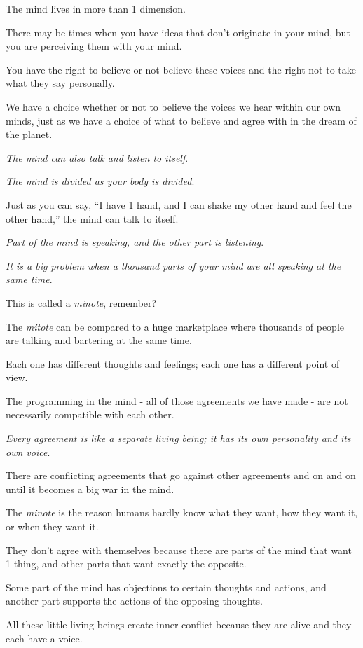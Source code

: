 \documentclass{article}
\numberwithin{equation}{section}
\begin{document}
The mind lives in more than 1 dimension.

There may be times when you have ideas that don't originate in your mind, but you are perceiving them with your mind.

You have the right to believe or not believe these voices and the right not to take what they say personally.

We have a choice whether or not to believe the voices we hear within our own minds, just as we have a choice of what to believe and agree with in the dream of the planet.

%
\textit{The mind can also talk and listen to itself}.

\textit{The mind is divided as your body is divided}.

Just as you can say, ``I have 1 hand, and I can shake my other hand and feel the other hand,'' the mind can talk to itself.

\textit{Part of the mind is speaking, and the other part is listening}.

\textit{It is a big problem when a thousand parts of your mind are all speaking at the same time}.

This is called a \textit{minote}, remember?

%
The \textit{mitote} can be compared to a huge marketplace where thousands of people are talking and bartering at the same time.

Each one has different thoughts and feelings; each one has a different point of view.

The programming in the mind - all of those agreements we have made - are not necessarily compatible with each other.

\textit{Every agreement is like a separate living being; it has its own personality and its own voice}.

There are conflicting agreements that go against other agreements and on and on until it becomes a big war in the mind.

The \textit{minote} is the reason humans hardly know what they want, how they want it, or when they want it.

They don't agree with themselves because there are parts of the mind that want 1 thing, and other parts that want exactly the opposite.

%
Some part of the mind has objections to certain thoughts and actions, and another part supports the actions of the opposing thoughts.

All these little living beings create inner conflict because they are alive and they each have a voice.
\end{document}
